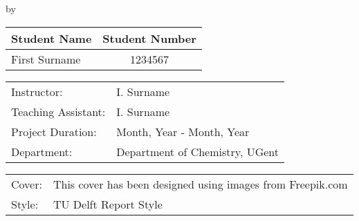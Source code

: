 \begin{titlepage}

\begin{center}

{\makeatletter
\largetitlestyle\fontsize{45}{45}\selectfont\@title
\makeatother}

{\makeatletter
\ifdefvoid{\@subtitle}{}{\bigskip\titlestyle\fontsize{20}{20}\selectfont\@subtitle}
\makeatother}

\bigskip
\bigskip

by

\bigskip
\bigskip

{\makeatletter
\largetitlestyle\fontsize{25}{25}\selectfont\@author
\makeatother}

\bigskip
\bigskip

\setlength\extrarowheight{2pt}
\begin{tabular}{lc}
    Student Name & Student Number \\\midrule
    First Surname & 1234567 \\
\end{tabular}

\vfill

\begin{tabular}{ll}
    Instructor: & I. Surname \\
    Teaching Assistant: & I. Surname \\
    Project Duration: & Month, Year - Month, Year \\
    Department: & Department of Chemistry, UGent
\end{tabular}

\bigskip
\bigskip

\begin{tabular}{p{15mm}p{10cm}}
    Cover: & This cover has been designed using images from Freepik.com \\
    Style: & TU Delft Report Style
\end{tabular}

\end{center}


\end{titlepage}
